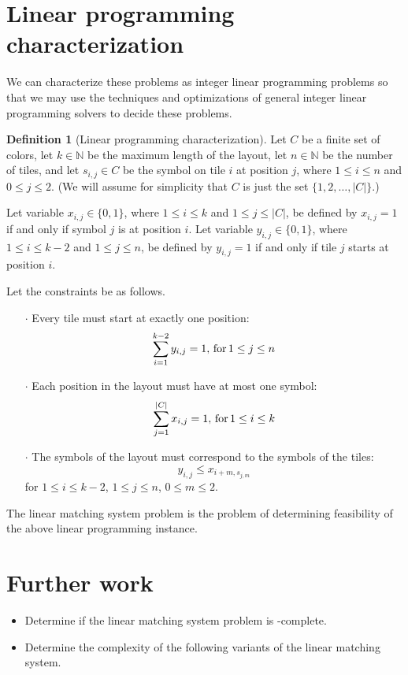 \documentclass{lposter}
\theoremstyle{definition} \newtheorem*{definition}{Definition}
\begin{document}
\begin{poster}
\section{Linear programming characterization}

We can characterize these problems as integer linear programming problems so
that we may use the techniques and optimizations of general integer linear
programming solvers to decide these problems.

\begin{shaded}
\begin{definition}[Linear programming characterization]
  Let $C$ be a finite set of colors, let $k\in\mathbb{N}$ be the maximum
  length of the layout, let $n\in\mathbb{N}$ be the number of tiles, and let
  $s_{i,j}\in C$ be the symbol on tile $i$ at position $j$, where $1\leq i\leq
  n$ and $0\leq j\leq 2$. (We will assume for simplicity that $C$ is just the
  set $\{1, 2,\ldots, |C|\}$.)

  Let variable $x_{i,j}\in\{0, 1\}$, where $1\leq i\leq k$ and $1\leq j\leq
  |C|$, be defined by $x_{i, j} = 1$ if and only if symbol $j$ is at position
  $i$. Let variable $y_{i,j}\in\{0, 1\}$, where $1\leq i\leq k-2$ and $1\leq
  j\leq n$, be defined by $y_{i, j} = 1$ if and only if tile $j$ starts at
  position $i$.
    
  Let the constraints be as follows.
  \begin{itemize}
  \item[$\cdot$] Every tile must start at exactly one position:
    \begin{displaymath}
      \sum_{i = 1}^{k - 2}{y_{i, j}} = 1,\,\textnormal{for}\, 1\leq j\leq n
    \end{displaymath}
  \item[$\cdot$] Each position in the layout must have at most one symbol:
    \begin{displaymath}
      \sum_{j = 1}^{|C|}{x_{i, j}} = 1,\,\textnormal{for}\, 1\leq i\leq k
    \end{displaymath}
  \item[$\cdot$] The symbols of the layout must correspond to the symbols of
    the tiles:
    \begin{displaymath}
      y_{i, j} \leq x_{i + m, s_{j, m}}
    \end{displaymath}
    for $1\leq i\leq k - 2$, $1\leq j\leq n$, $0\leq m\leq 2$.
  \end{itemize}
    
  The linear matching system problem is the problem of determining feasibility
  of the above linear programming instance.
\end{definition}
\end{shaded}

\section{Further work}

\begin{itemize}
\item
Determine if the linear matching system problem is \NP-complete.
\item
Determine the complexity of the following variants of the linear matching
system.
\end{itemize}
%

\end{poster}
\end{document}
